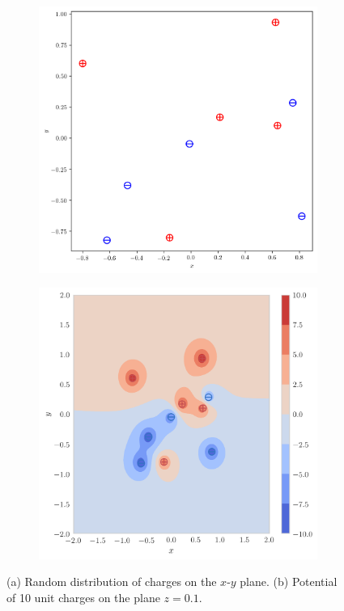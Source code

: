 \documentclass[12pt,a4paper,twoside]{article}
\begin{document}
\begin{figure}[tb]
    \centering
	\begin{subfigure}[h!]{0.45\textwidth}
		\centering
		\includegraphics[width=\textwidth]{113.png}
		\caption{}
		\label{fig:plane}
	\end{subfigure}
	\begin{subfigure}[h!]{0.45\textwidth}
		\centering
		\includegraphics[width=\textwidth]{115.png}
		\caption{}
		\label{fig:contour}
	\end{subfigure}
	\caption{(a) Random distribution of charges on the $x$-$y$ plane. (b) Potential of 10 unit charges on the plane $z=0.1$.}
	\label{fig:projections}
\end{figure}
\end{document}
